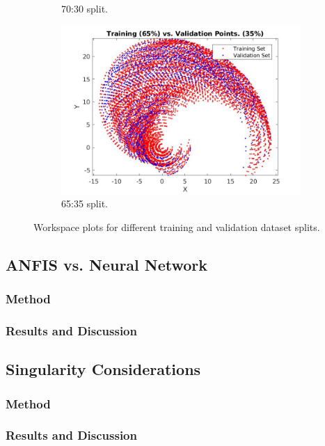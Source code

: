 \documentclass[a4paper, oneside, 12pt]{article}
\begin{document}
\begin{figure}[H]
\begin{subfigure}{0.48\textwidth}
		\caption{70:30 split.}
		\label{fig::1c}
	\end{subfigure}	
	\begin{subfigure}{0.48\textwidth}
		\includegraphics[width=1\textwidth]{trnvsval65.jpg}
		\caption{65:35 split.}
		\label{fig::1d}
	\end{subfigure}	
	\caption{Workspace plots for different training and validation dataset splits.}
	\label{fig::1}
\end{figure}

\newpage
\subsection{ANFIS vs. Neural Network}
\subsubsection{Method}
\subsubsection{Results and Discussion}

\newpage
\subsection{Singularity Considerations}
\subsubsection{Method}
\subsubsection{Results and Discussion}
\end{document}

